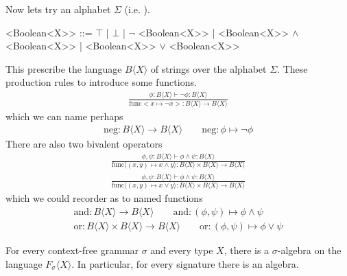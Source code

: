 \begin{example}
    Now lets try an alphabet $\Sigma$ (i.e. ).
\begin{center}
\begin{Gcode}[]
<Boolean<X>> ::= $\top$
                | $\bot$
                | $\neg$ <Boolean<X>>
                | <Boolean<X>> $\wedge$ <Boolean<X>>
                | <Boolean<X>> $\vee$ <Boolean<X>>
\end{Gcode}
\end{center}
This prescribe the language $B\langle X\rangle$ of strings over the alphabet $\Sigma$.
    These production rules to introduce some functions.
    \begin{gather*}
        \frac{
            \phi:B\langle X\rangle \vdash \neg\phi:B\langle X\rangle
        }{
            \text{func}<x\mapsto \neg x>:B\langle X\rangle \to B\langle X\rangle
        }
    \end{gather*}
    which we can name perhaps
    \begin{gather*}
        \text{neg}:B\langle X\rangle \to B\langle X\rangle
        \qquad \text{neg}:\phi \mapsto \neg \phi
    \end{gather*}
    There are also two bivalent operators
    \begin{gather*}
        \frac{
            \phi,\psi:B\langle X\rangle \vdash \phi\wedge \psi:B\langle X\rangle
        }{
            \text{func}\langle (x,y)\mapsto x\wedge y\rangle:
             B\langle X\rangle\times B\langle X\rangle \to B\langle X\rangle
        }\\
        \frac{
            \phi,\psi:B\langle X\rangle \vdash \phi\wedge \psi:B\langle X\rangle
        }{
            \text{func}\langle (x,y)\mapsto x\vee y\rangle:
            B\langle X\rangle\times B\langle X\rangle \to B\langle X\rangle
        }
    \end{gather*}
    which we could recorder as to named functions
    \begin{gather*}
        \text{and}:B\langle X\rangle \to B\langle X\rangle
        \qquad \text{and}:(\phi,\psi) \mapsto \phi\wedge \psi\\
        \text{or}:B\langle X\rangle\times B\langle X\rangle \to B\langle X\rangle
        \qquad \text{or}:(\phi,\psi) \mapsto \phi\vee\psi
    \end{gather*}

\end{example}



\begin{theorem}
    For every context-free grammar $\sigma$ and every type $X$, 
    there is a $\sigma$-algebra on the language $F_{\sigma}\langle X\rangle$.
    In particular, for every signature there is an algebra.
\end{theorem}

